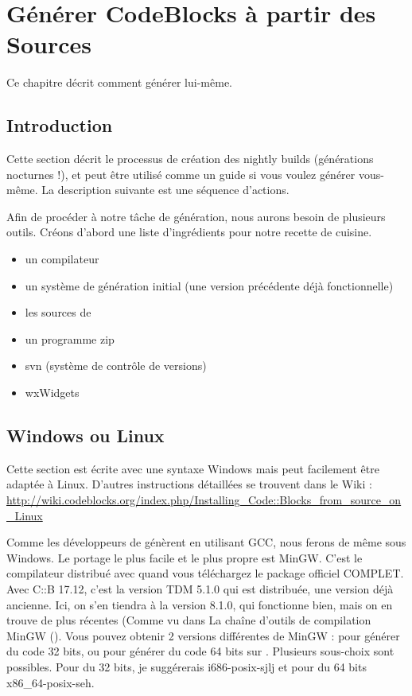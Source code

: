 \chapter{Générer CodeBlocks à partir des Sources}\label{sec:build_codeblocks}

Ce chapitre décrit comment générer \codeblocks lui-même.


\section{Introduction}

Cette section décrit le processus de création des nightly builds (générations nocturnes !), et peut être utilisé comme un guide si vous voulez générer \codeblocks vous-même. La description suivante est une séquence d'actions.

Afin de procéder à notre tâche de génération, nous aurons besoin de plusieurs outils. Créons d'abord une liste d'ingrédients pour notre recette de cuisine.

\begin{itemize}
\item un compilateur
\item un système de génération initial (une version précédente déjà fonctionnelle)
\item les sources de \codeblocks
\item un programme zip
\item svn (système de contrôle de versions)
\item wxWidgets
\end{itemize}

\section{Windows ou Linux}

Cette section est écrite avec une syntaxe Windows mais peut facilement être adaptée à Linux.
D'autres instructions détaillées se trouvent dans le Wiki : \url{http://wiki.codeblocks.org/index.php/Installing_Code::Blocks_from_source_on_Linux}

Comme les développeurs de \codeblocks génèrent \codeblocks en utilisant GCC, nous ferons de même sous Windows. Le portage le plus facile et le plus propre est MinGW. C'est le compilateur distribué avec \codeblocks quand vous téléchargez le package officiel COMPLET. Avec C::B 17.12, c'est la version TDM 5.1.0 qui est distribuée, une version déjà ancienne. Ici, on s'en tiendra à la version 8.1.0, qui fonctionne bien, mais on en trouve de plus récentes (Comme vu dans La chaîne d'outils de compilation MinGW (). Vous pouvez obtenir 2 versions différentes de MinGW : pour générer du code 32 bits, ou pour générer du code 64 bits sur \cite{url:mingw64}. Plusieurs sous-choix sont possibles. Pour du 32 bits, je suggérerais i686-posix-sjlj et pour du 64 bits x86\_64-posix-seh.

